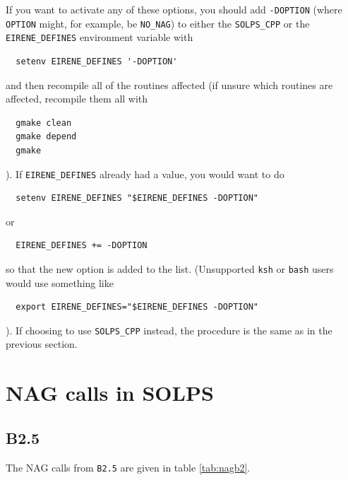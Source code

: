 \documentclass[a4paper,10pt]{report}
\begin{document}
If you want to activate any of these options, you should add
{\tt -DOPTION} (where {\tt OPTION} might, for example, be
{\tt NO\_NAG}) to either the {\tt SOLPS\_CPP} or the
{\tt EIRENE\_DEFINES} environment variable with
\begin{verbatim}
  setenv EIRENE_DEFINES '-DOPTION'
\end{verbatim}
and then recompile all of the routines affected (if unsure which
routines are affected, recompile them all with
\begin{verbatim}
  gmake clean
  gmake depend
  gmake
\end{verbatim}
).  If {\tt EIRENE\_DEFINES} already had a value, you would want to do
\begin{verbatim}
  setenv EIRENE_DEFINES "$EIRENE_DEFINES -DOPTION"
\end{verbatim}
or
\begin{verbatim}
  EIRENE_DEFINES += -DOPTION
\end{verbatim}
so that the new option is added to the list. (Unsupported {\tt ksh}
or {\tt bash} users would use something like
\begin{verbatim}
  export EIRENE_DEFINES="$EIRENE_DEFINES -DOPTION"
\end{verbatim}
). If choosing to use {\tt SOLPS\_CPP} instead, the procedure is the same as
in the previous section.

\section{NAG calls in SOLPS}

\subsection{B2.5}

The NAG calls from {\tt B2.5} are given in table \ref{tab:nagb2}.
\end{document}
